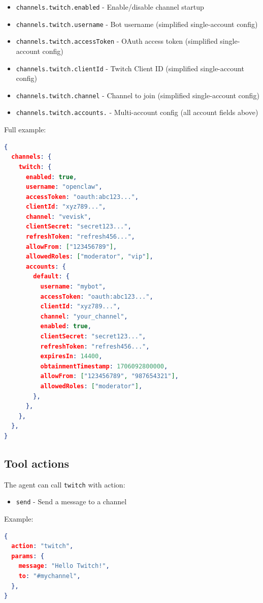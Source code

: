 \begin{itemize}
  \item \texttt{channels.twitch.enabled} - Enable/disable channel startup
  \item \texttt{channels.twitch.username} - Bot username (simplified single-account config)
  \item \texttt{channels.twitch.accessToken} - OAuth access token (simplified single-account config)
  \item \texttt{channels.twitch.clientId} - Twitch Client ID (simplified single-account config)
  \item \texttt{channels.twitch.channel} - Channel to join (simplified single-account config)
  \item \texttt{channels.twitch.accounts.} - Multi-account config (all account fields above)
\end{itemize}


Full example:

\begin{lstlisting}[language=json]
{
  channels: {
    twitch: {
      enabled: true,
      username: "openclaw",
      accessToken: "oauth:abc123...",
      clientId: "xyz789...",
      channel: "vevisk",
      clientSecret: "secret123...",
      refreshToken: "refresh456...",
      allowFrom: ["123456789"],
      allowedRoles: ["moderator", "vip"],
      accounts: {
        default: {
          username: "mybot",
          accessToken: "oauth:abc123...",
          clientId: "xyz789...",
          channel: "your_channel",
          enabled: true,
          clientSecret: "secret123...",
          refreshToken: "refresh456...",
          expiresIn: 14400,
          obtainmentTimestamp: 1706092800000,
          allowFrom: ["123456789", "987654321"],
          allowedRoles: ["moderator"],
        },
      },
    },
  },
}
\end{lstlisting}


\subsection{Tool actions}


The agent can call \texttt{twitch} with action:

\begin{itemize}
  \item \texttt{send} - Send a message to a channel
\end{itemize}


Example:

\begin{lstlisting}[language=json]
{
  action: "twitch",
  params: {
    message: "Hello Twitch!",
    to: "#mychannel",
  },
}
\end{lstlisting}


